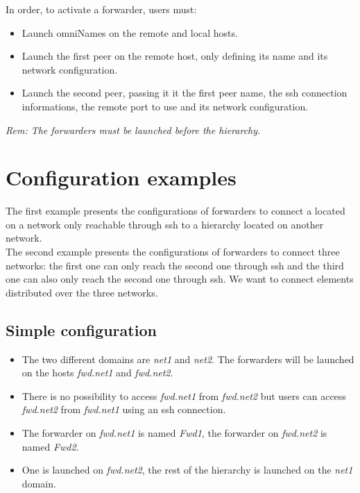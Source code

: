 \noindent In order, to activate a \diet forwarder, users must:
\begin{itemize}
\item Launch omniNames on the remote and local hosts.
\item Launch the first peer on the remote host, only defining its name
  and its network configuration.
\item Launch the second peer, passing it it the first peer name, the
  ssh connection informations, the remote port to use and its network
  configuration.
\end{itemize}

\noindent\textit{Rem: The forwarders must be launched before the \diet
  hierarchy.}



\section{Configuration examples}
\label{sec:ForwarderExamples}

The first example presents the configurations of \diet forwarders to
connect a \sed located on a network only reachable through ssh to a
\diet hierarchy located on another network.\\

The second example presents the configurations of \diet forwarders to
connect three networks: the first one can only reach the second one
through ssh and the third one can also only reach the second one
through ssh. We want to connect \diet elements distributed over the
three networks.

\subsection{Simple configuration}
\begin{itemize}
\item The two different domains are \textit{net1} and \textit{net2}. The forwarders will
  be launched on the hosts \textit{fwd.net1} and \textit{fwd.net2}.
\item There is no possibility to access \textit{fwd.net1} from
  \textit{fwd.net2} but users can access \textit{fwd.net2} from
  \textit{fwd.net1} using an ssh connection.
\item The forwarder on \textit{fwd.net1} is named \textit{Fwd1}, the
  forwarder on \textit{fwd.net2} is named \textit{Fwd2}.
\item One \sed is launched on \textit{fwd.net2}, the rest of the \diet
  hierarchy is launched on the \textit{net1} domain.\\
\end{itemize}


